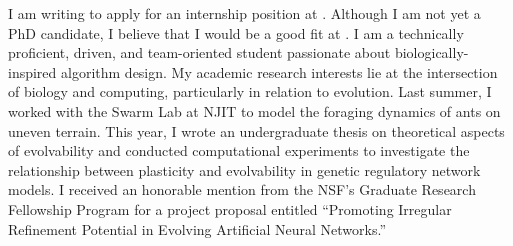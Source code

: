 I am writing to apply for an internship position at {\companylong}.
Although I am not yet a PhD candidate, I believe that I would be a good fit at {\companyshort}.
I am a technically proficient, driven, and team-oriented student passionate about biologically-inspired algorithm design.
My academic research interests lie at the intersection of biology and computing, particularly in relation to evolution.
Last summer, I worked with the Swarm Lab at NJIT to model the foraging dynamics of ants on uneven terrain.
This year, I wrote an undergraduate thesis on theoretical aspects of evolvability and conducted computational experiments to investigate the relationship between plasticity and evolvability in genetic regulatory network models.
I received an honorable mention from the NSF's Graduate Research Fellowship Program for a project proposal entitled ``Promoting Irregular Refinement Potential in Evolving Artificial Neural Networks.''
